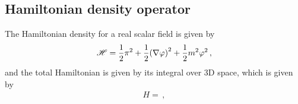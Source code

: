\documentclass[main.tex]{subfiles}
\begin{document}
\subsection{Hamiltonian density operator}

The Hamiltonian density for a real scalar field is given by 
%
\begin{align}
\mathscr{H} = \frac{1}{2} \pi^2 + \frac{1}{2} \qty(\nabla \varphi )^2 + \frac{1}{2} m^2\varphi^2
\,,
\end{align}
%
and the total Hamiltonian is given by its integral over 3D space, which is given by 
%
\begin{align}
H = 
\,,
\end{align}
%
\end{document}

